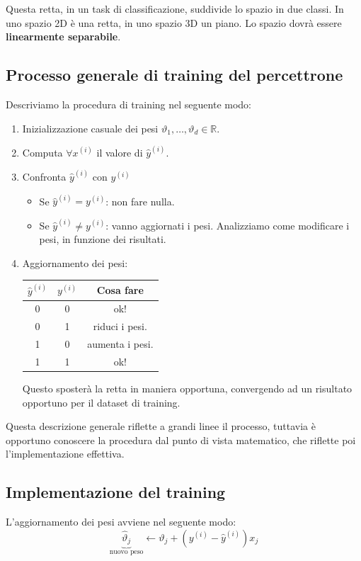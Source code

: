 Questa retta, in un task di classificazione, suddivide lo spazio in due classi. In uno spazio 2D è una retta, in uno spazio 3D un piano. Lo spazio dovrà essere \textbf{linearmente separabile}.

\subsection{Processo generale di training del percettrone}
Descriviamo la procedura di training nel seguente modo:

\begin{enumerate}
	\item Inizializzazione casuale dei pesi $\vartheta_1, \dots, \vartheta_d \in \mathbb{R}$.
	\item Computa $\forall x^{(i)}$ il valore di $\hat{y}^{(i)}$.
	\item Confronta $\hat{y}^{(i)}$ con $y^{(i)}$
	\begin{itemize}
		\item Se  $\hat{y}^{(i)} = y^{(i)}$: non fare nulla.
		\item Se $\hat{y}^{(i)} \neq y^{(i)}$: vanno aggiornati i pesi. Analizziamo come modificare i pesi, in funzione dei risultati.
	\end{itemize}
	
	\item Aggiornamento dei pesi:
	
	\begin{center}
		\begin{tabular}{|c|c|c|}
			\hline
			$\hat{y}^{(i)}$ & $y^{(i)}$ & Cosa fare\\
			\hline
			0 & 0 & ok!\\
			0 & 1 & riduci i pesi.\\
			1 & 0 & aumenta i pesi.\\
			1 & 1 & ok!\\
			\hline
		\end{tabular}
	\end{center}
	
	Questo sposterà la retta in maniera opportuna, convergendo ad un risultato opportuno per il dataset di training.
\end{enumerate}

Questa descrizione generale riflette a grandi linee il processo, tuttavia è opportuno conoscere la procedura dal punto di vista matematico, che riflette poi l'implementazione effettiva.

\subsection{Implementazione del training}
L'aggiornamento dei pesi avviene nel seguente modo:
$$
\underbrace{\hat{\vartheta}_j}_\text{nuovo peso}\leftarrow \vartheta_j + ( y^{(i)} -\hat{y}^{(i)})x_j
$$

